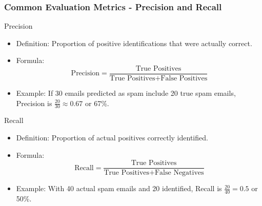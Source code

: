 \documentclass[aspectratio=169]{beamer}
\begin{document}
\begin{frame}[fragile]
    \frametitle{Common Evaluation Metrics - Precision and Recall}
    \begin{block}{Precision}
        \begin{itemize}
            \item Definition: Proportion of positive identifications that were actually correct.
            \item Formula: 
            \[
            \text{Precision} = \frac{\text{True Positives}}{\text{True Positives} + \text{False Positives}}
            \]
            \item Example: If 30 emails predicted as spam include 20 true spam emails, Precision is \( \frac{20}{30} \approx 0.67 \) or 67\%.
        \end{itemize}
    \end{block}
    
    \begin{block}{Recall}
        \begin{itemize}
            \item Definition: Proportion of actual positives correctly identified.
            \item Formula: 
            \[
            \text{Recall} = \frac{\text{True Positives}}{\text{True Positives} + \text{False Negatives}}
            \]
            \item Example: With 40 actual spam emails and 20 identified, Recall is \( \frac{20}{40} = 0.5 \) or 50\%.
        \end{itemize}
    \end{block}
\end{frame}
\end{document}
